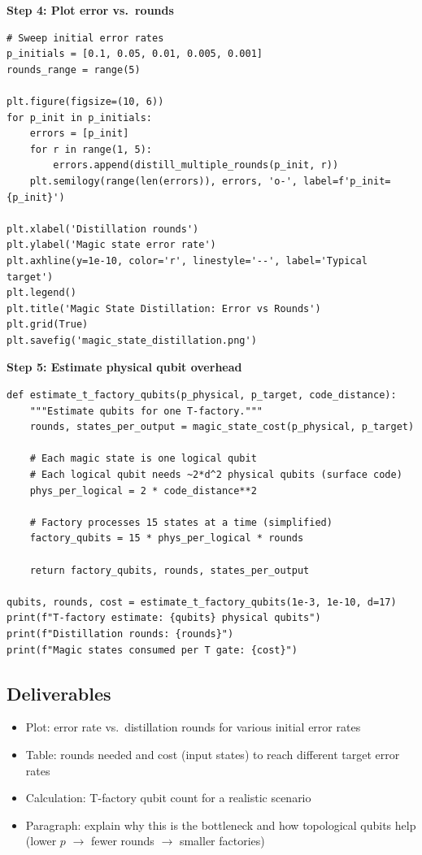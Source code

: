 \documentclass[11pt,a4paper]{article}
\begin{document}
\textbf{Step 4: Plot error vs.\ rounds}
\begin{lstlisting}
# Sweep initial error rates
p_initials = [0.1, 0.05, 0.01, 0.005, 0.001]
rounds_range = range(5)

plt.figure(figsize=(10, 6))
for p_init in p_initials:
    errors = [p_init]
    for r in range(1, 5):
        errors.append(distill_multiple_rounds(p_init, r))
    plt.semilogy(range(len(errors)), errors, 'o-', label=f'p_init={p_init}')

plt.xlabel('Distillation rounds')
plt.ylabel('Magic state error rate')
plt.axhline(y=1e-10, color='r', linestyle='--', label='Typical target')
plt.legend()
plt.title('Magic State Distillation: Error vs Rounds')
plt.grid(True)
plt.savefig('magic_state_distillation.png')
\end{lstlisting}

\textbf{Step 5: Estimate physical qubit overhead}
\begin{lstlisting}
def estimate_t_factory_qubits(p_physical, p_target, code_distance):
    """Estimate qubits for one T-factory."""
    rounds, states_per_output = magic_state_cost(p_physical, p_target)
    
    # Each magic state is one logical qubit
    # Each logical qubit needs ~2*d^2 physical qubits (surface code)
    phys_per_logical = 2 * code_distance**2
    
    # Factory processes 15 states at a time (simplified)
    factory_qubits = 15 * phys_per_logical * rounds
    
    return factory_qubits, rounds, states_per_output

qubits, rounds, cost = estimate_t_factory_qubits(1e-3, 1e-10, d=17)
print(f"T-factory estimate: {qubits} physical qubits")
print(f"Distillation rounds: {rounds}")
print(f"Magic states consumed per T gate: {cost}")
\end{lstlisting}

\subsection*{Deliverables}
\begin{itemize}
    \item[\checkmark] Plot: error rate vs.\ distillation rounds for various initial error rates
    \item[\checkmark] Table: rounds needed and cost (input states) to reach different target error rates
    \item[\checkmark] Calculation: T-factory qubit count for a realistic scenario
    \item[\checkmark] Paragraph: explain why this is the bottleneck and how topological qubits help (lower $p$ $\to$ fewer rounds $\to$ smaller factories)
\end{itemize}
\end{document}

